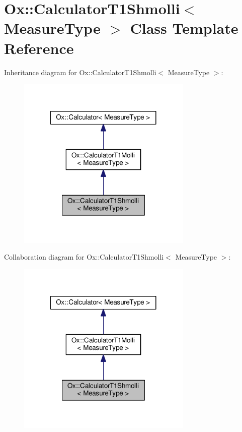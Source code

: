 \hypertarget{class_ox_1_1_calculator_t1_shmolli}{\section{Ox\-:\-:Calculator\-T1\-Shmolli$<$ Measure\-Type $>$ Class Template Reference}
\label{class_ox_1_1_calculator_t1_shmolli}
}


Inheritance diagram for Ox\-:\-:Calculator\-T1\-Shmolli$<$ Measure\-Type $>$\-:
\nopagebreak
\begin{figure}[H]
\begin{center}
\leavevmode
\includegraphics[width=236pt]{class_ox_1_1_calculator_t1_shmolli__inherit__graph}
\end{center}
\end{figure}


Collaboration diagram for Ox\-:\-:Calculator\-T1\-Shmolli$<$ Measure\-Type $>$\-:
\nopagebreak
\begin{figure}[H]
\begin{center}
\leavevmode
\includegraphics[width=236pt]{class_ox_1_1_calculator_t1_shmolli__coll__graph}
\end{center}
\end{figure}
